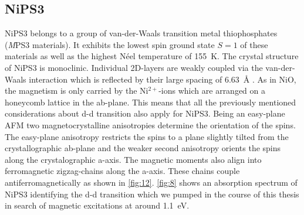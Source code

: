 \subsection{NiPS3}
NiPS3 belongs to a group of van-der-Waals transition metal thiophosphates (\textit{M}PS3 materials).
It exhibits the lowest spin ground state $S=1$ of these materials as well as the highest Néel temperature of \qty{155}{K}.
The crystal structure of NiPS3 is monoclinic.
Individual 2D-layers are weakly coupled via the van-der-Waals interaction which is reflected by their large spacing of \qty{6.63}{\angstrom} \cite{afanasiev_controlling_2021}.
As in NiO, the magnetism is only carried by the Ni$^{2+}$-ions which are arranged on a honeycomb lattice in the ab-plane.
This means that all the previously mentioned considerations about d-d transition also apply for NiPS3. 
Being an easy-plane AFM two magnetocrystalline anisotropies determine the orientation of the spins.
The easy-plane anisotropy restricts the spins to a plane slightly tilted from the crystallographic ab-plane and the weaker second anisotropy orients the spins along the crystalographic a-axis.
The magnetic moments also align into ferromagnetic zigzag-chains along the a-axis.
These chains couple antiferromagnetically as shown in \autoref{fig:12}.
\autoref{fig:8} shows an absorption spectrum of NiPS3 identifying the d-d transition which we pumped in the course of this thesis in search of magnetic excitations at around \qty{1.1}{eV}.

